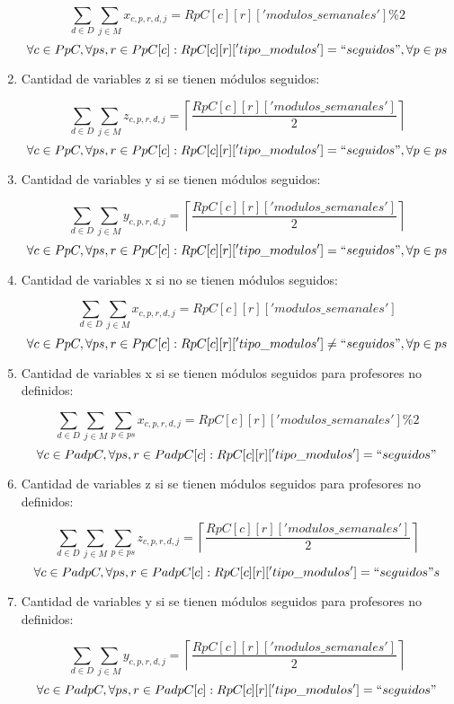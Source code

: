 \documentclass[letterpaper]{article}
\begin{document}
\begin{enumerate}
    $$\sum_{d \in D} \sum_{j \in M} x_{c,p,r,d,j} = RpC[c][r]['modulos\_semanales'] \% 2$$
    $$\forall c \in PpC, \forall ps,r \in PpC[c] : RpC[c][r]['tipo\_modulos'] = ``seguidos", \forall p \in ps$$

    \item Cantidad de variables z si se tienen módulos seguidos:
    
    $$\sum_{d \in D} \sum_{j \in M} z_{c,p,r,d,j} = \left \lceil \dfrac{RpC[c][r] ['modulos\_semanales']}{2} \right\rceil $$
    $$\forall c \in PpC, \forall ps,r \in PpC[c] : RpC[c][r]['tipo\_modulos'] = ``seguidos", \forall p \in ps$$

    \item Cantidad de variables y si se tienen módulos seguidos:
    
    $$\sum_{d \in D} \sum_{j \in M} y_{c,p,r,d,j} = \left \lceil \dfrac{RpC[c][r] ['modulos\_semanales']}{2} \right\rceil $$
    $$\forall c \in PpC, \forall ps,r \in PpC[c] : RpC[c][r]['tipo\_modulos'] = ``seguidos", \forall p \in ps$$

    \item Cantidad de variables x si no se tienen módulos seguidos:
    
    $$\sum_{d \in D} \sum_{j \in M} x_{c,p,r,d,j} = RpC[c][r] ['modulos\_semanales'] $$
    $$\forall c \in PpC, \forall ps,r \in PpC[c] : RpC[c][r]['tipo\_modulos'] \neq ``seguidos", \forall p \in ps$$

    \item Cantidad de variables x si se tienen módulos seguidos para profesores no definidos:

    $$\sum_{d \in D} \sum_{j \in M} \sum_{p \in ps} x_{c,p,r,d,j} = RpC[c][r]['modulos\_semanales'] \% 2$$
    $$\forall c \in PadpC, \forall ps,r \in PadpC[c] : RpC[c][r]['tipo\_modulos'] = ``seguidos"$$

    \item Cantidad de variables z si se tienen módulos seguidos para profesores no definidos:
    
    $$\sum_{d \in D} \sum_{j \in M} \sum_{p \in ps} z_{c,p,r,d,j} = \left \lceil \dfrac{RpC[c][r] ['modulos\_semanales']}{2} \right\rceil $$
    $$\forall c \in PadpC, \forall ps,r \in PadpC[c] : RpC[c][r]['tipo\_modulos'] = ``seguidos"s$$

    \item Cantidad de variables y si se tienen módulos seguidos para profesores no definidos:
    
    $$\sum_{d \in D} \sum_{j \in M} y_{c,p,r,d,j} = \left \lceil \dfrac{RpC[c][r] ['modulos\_semanales']}{2} \right\rceil $$
    $$\forall c \in PadpC, \forall ps,r \in PadpC[c] : RpC[c][r]['tipo\_modulos'] = ``seguidos"$$


\end{enumerate}
\end{document}
